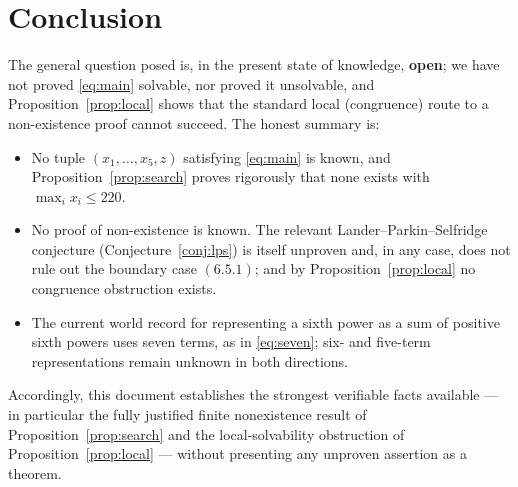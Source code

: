 \documentclass{amsart}
\begin{document}
\section*{Conclusion}

The general question posed is, in the present state of knowledge,
\textbf{open}; we have not proved \eqref{eq:main} solvable, nor proved
it unsolvable, and Proposition~\ref{prop:local} shows that the standard
local (congruence) route to a non-existence proof cannot succeed. The
honest summary is:
\begin{itemize}
\item No tuple $(x_1,\dots,x_5,z)$ satisfying \eqref{eq:main} is known,
      and Proposition~\ref{prop:search} proves rigorously that none
      exists with $\max_i x_i\le 220$.
\item No proof of non-existence is known. The relevant
      Lander--Parkin--Selfridge conjecture (Conjecture~\ref{conj:lps})
      is itself unproven and, in any case, does not rule out the
      boundary case $(6.5.1)$; and by Proposition~\ref{prop:local} no
      congruence obstruction exists.
\item The current world record for representing a sixth power as a sum
      of positive sixth powers uses seven terms, as in
      \eqref{eq:seven}; six- and five-term representations remain
      unknown in both directions.
\end{itemize}
Accordingly, this document establishes the strongest verifiable facts
available --- in particular the fully justified finite nonexistence
result of Proposition~\ref{prop:search} and the local-solvability
obstruction of Proposition~\ref{prop:local} --- without presenting any
unproven assertion as a theorem.
\end{document}
